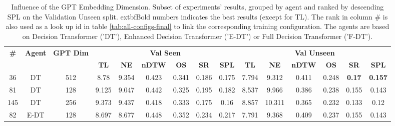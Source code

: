 \begin{table}
\centering
\caption{\label{tab:dim_test}Influence of the GPT Embedding Dimension. Subset of experiments' results, grouped by agent and ranked by descending SPL on the Validation Unseen split. 	extbf{Bold} numbers indicates the best results (except for TL). The rank in column \# is also used as a look up id in table \ref{tab:all-configs-final} to link the corresponding training configuration.     \newline The agents are based on Decision Transformer ('DT'), Enhanced Decision Transformer ('E-DT') or Full Decision Transformer ('F-DT').}
\begin{tabular}{@{\hskip3pt}c@{\hskip3pt}c@{\hskip3pt}c@{\hskip3pt}c@{\hskip3pt}c@{\hskip3pt}c@{\hskip3pt}c@{\hskip3pt}c@{\hskip3pt}c@{\hskip3pt}c@{\hskip3pt}c@{\hskip3pt}c@{\hskip3pt}c@{\hskip3pt}c@{\hskip3pt}c}
\toprule
\textbf{\#} & \textbf{Agent} & \textbf{GPT Dim} & \multicolumn{6}{c}{\textbf{Val Seen}} & \multicolumn{6}{c}{\textbf{Val Unseen}} \\
 \textbf{~} &     \textbf{~} &       \textbf{~} &       \textbf{TL} &     \textbf{NE} &   \textbf{nDTW} &     \textbf{OS} &     \textbf{SR} &    \textbf{SPL} &         \textbf{TL} &     \textbf{NE} &   \textbf{nDTW} &    \textbf{OS} &    \textbf{SR} &    \textbf{SPL} \\
\midrule
         36 &             DT &              512 &              8.78 &           9.354 &           0.423 &           0.341 &           0.186 &           0.175 &               7.794 &           9.312 &           0.411 &          0.248 &  \textbf{0.17} &  \textbf{0.157} \\
         81 &             DT &              128 &             9.125 &           9.047 &           0.442 &           0.325 &           0.195 &           0.182 &               8.537 &           9.966 &           0.386 &          0.238 &          0.155 &           0.143 \\
        145 &             DT &              256 &             9.373 &           9.437 &           0.418 &           0.333 &           0.175 &            0.16 &               8.857 &          10.311 &           0.365 &          0.232 &          0.133 &            0.12 \\
         82 &           E-DT &              128 &             8.697 &           8.677 &           0.448 &           0.352 &           0.234 &           0.217 &               7.791 &           9.368 &           0.409 &          0.237 &          0.155 &           0.143 \\

\end{tabular}
\end{table}
